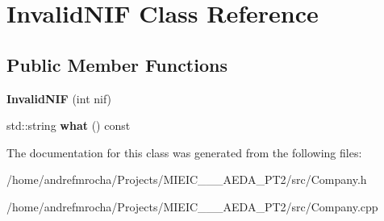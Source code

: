 \hypertarget{class_invalid_n_i_f}{}\section{Invalid\+N\+IF Class Reference}
\label{class_invalid_n_i_f}
\subsection*{Public Member Functions}
\begin{DoxyCompactItemize}
\item 
\mbox{\label{class_invalid_n_i_f_a4f872703f283216c822fed2ea52ea3b5}} 
{\bfseries Invalid\+N\+IF} (int nif)
\item 
\mbox{\label{class_invalid_n_i_f_aa68eefbe2a75cd3ce2cba466bf3d1dcf}} 
std\+::string {\bfseries what} () const
\end{DoxyCompactItemize}


The documentation for this class was generated from the following files\+:\begin{DoxyCompactItemize}
\item 
/home/andrefmrocha/\+Projects/\+M\+I\+E\+I\+C\+\_\+\_\+\_\+\+A\+E\+D\+A\+\_\+\+P\+T2/src/Company.\+h\item 
/home/andrefmrocha/\+Projects/\+M\+I\+E\+I\+C\+\_\+\_\+\_\+\+A\+E\+D\+A\+\_\+\+P\+T2/src/Company.\+cpp\end{DoxyCompactItemize}
